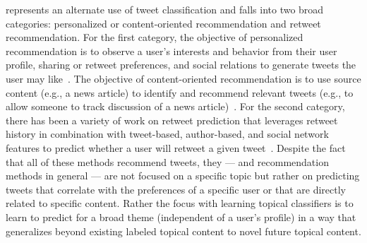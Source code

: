 % 

\vspace{2mm}
 represents an alternate use of
tweet classification and falls into two broad categories: personalized or
content-oriented recommendation and retweet recommendation.  For the
first category, the objective of personalized recommendation is to
observe a user's interests and behavior from their user profile,
sharing or retweet preferences, and social relations to generate
tweets the user may like~\cite{Yan,chen}.  The objective of
content-oriented recommendation is to use source content (e.g., a news
article) to identify and recommend relevant tweets (e.g., to allow
someone to track discussion of a news article)~\cite{Krestel}.  For
the second category, there has been a variety of work on retweet
prediction that leverages retweet history in combination with
tweet-based, author-based, and social network features to predict
whether a user will retweet a given
tweet~\cite{can,xu,petrovicOsborne}.  Despite the fact that all of
these methods recommend tweets, they --- and recommendation methods in
general --- are not focused on a specific topic but rather on
predicting tweets that correlate with the preferences of a specific
user or that are directly related to specific content.  Rather the
focus with learning topical classifiers is to learn to predict for
a broad theme (independent of a user's profile) in a way that
generalizes beyond existing labeled topical content to novel future
topical content.



